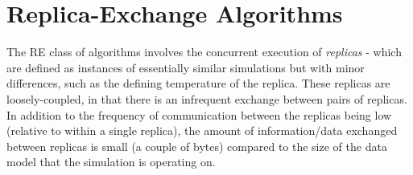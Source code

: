 \documentclass{rspublic}
\newcommand{\jhanote}[1]{ {\textcolor{red} { ***shantenu: #1 }}}
\newcommand{\alnote}[1]{ {\textcolor{blue} { ***andre: #1 }}}
\newcommand{\athotanote}[1]{ {\textcolor{green} { ***athota: #1 }}}
\newcommand{\alnote}[1]{}
\newcommand{\athotanote}[1]{}
\newcommand{\jhanote}[1]{}
\begin{document}



\section{Replica-Exchange Algorithms}\label{sec:repex-approach}

The RE class of algorithms involves the concurrent execution of
\emph{replicas} - which are defined as instances of essentially
similar simulations but with minor differences, such as the defining
temperature of the replica. These replicas are loosely-coupled, in
that there is an infrequent exchange between pairs of 
replicas. In addition to the frequency of communication between the
replicas being low (relative to within a single replica), the amount
of information/data exchanged between replicas is small (a couple of bytes) 
compared to the size of the data model that the simulation is 
operating on. 

\end{document}

